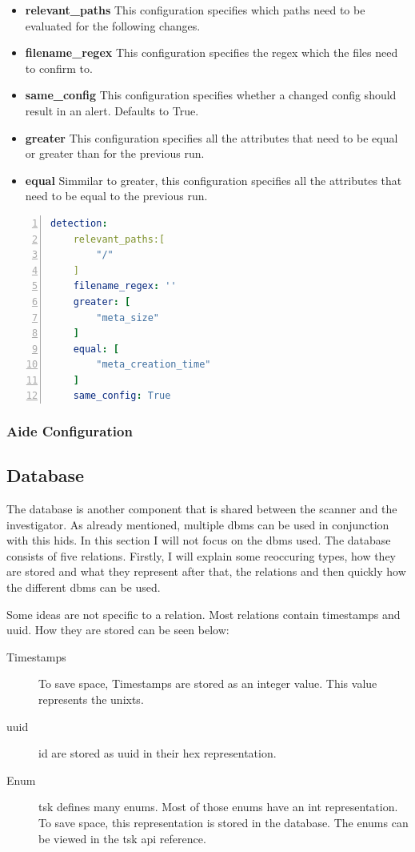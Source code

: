 \begin{itemize}
	\item \textbf{relevant\_paths} This configuration specifies which paths need to be evaluated for the following changes. 
	\item \textbf{filename\_regex} This configuration specifies the regex which the files need to confirm to.  
	\item \textbf{same\_config} This configuration specifies whether a changed config should result in an alert. Defaults to True.
	\item \textbf{greater} This configuration specifies all the attributes that need to be equal or greater than for the previous run.
	\item \textbf{equal} Simmilar to greater, this configuration specifies all the attributes that need to be equal to the previous run.
\end{itemize}

\begin{lstlisting}[language=yaml, numbers=left, caption=Investigator Configuration, label=lst:cfg:investigator]
detection:
	relevant_paths:[
		"/"
	]
	filename_regex: ''
	greater: [
		"meta_size"
	]
	equal: [
		"meta_creation_time"
	]
	same_config: True
\end{lstlisting}

\subsubsection{Aide Configuration}
\label{sec:aide:config}



\subsection{Database}
\label{sec:Database}

The database is another component that is shared between the scanner and the investigator. As already mentioned, multiple \gls{dbms} can be used in conjunction with this \gls{hids}. In this section I will not focus on the \gls{dbms} used. The database consists of five relations. Firstly, I will explain some reoccuring types, how they are stored and what they represent after that, the relations and then quickly how the different \gls{dbms} can be used. 

Some ideas are not specific to a relation. Most relations contain timestamps and \gls{uuid}. How they are stored can be seen below:

\begin{description}
	\item [Timestamps] To save space, Timestamps are stored as an integer value. This value represents the \gls{unixts}. 
	\item [\gls{uuid}] \gls{id} are stored as \gls{uuid} in their \gls{hex} representation. 
	\item [Enum] \gls{tsk} defines many enums. Most of those enums have an int representation. To save space, this representation is stored in the database. The enums can be viewed in the \gls{tsk} \gls{api} reference. \cite{tsk:file:header}
\end{description}


